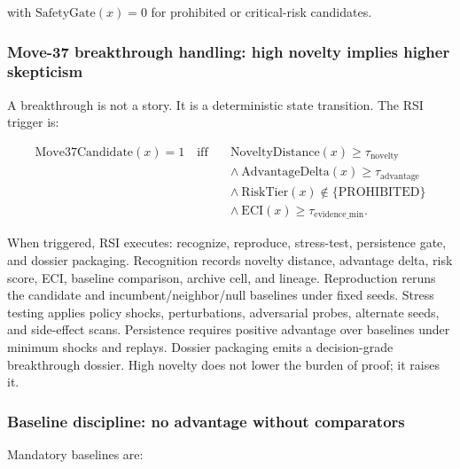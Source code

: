 \documentclass[
  11pt,
]{article}
\begin{document}
with \(\mathrm{SafetyGate}(x)=0\) for prohibited or critical-risk
candidates.

\subsubsection{Move-37 breakthrough handling: high novelty implies
higher
skepticism}\label{move-37-breakthrough-handling-high-novelty-implies-higher-skepticism}

A breakthrough is not a story. It is a deterministic state transition.
The RSI trigger is:

\[
\begin{aligned}
\mathrm{Move37Candidate}(x)=1
\quad\mathrm{iff}\quad&
\mathrm{NoveltyDistance}(x)\geq\tau_{\mathrm{novelty}}\\
&\wedge\ \mathrm{AdvantageDelta}(x)\geq\tau_{\mathrm{advantage}}\\
&\wedge\ \mathrm{RiskTier}(x)\notin\{\mathrm{PROHIBITED}\}\\
&\wedge\ \mathrm{ECI}(x)\geq\tau_{\mathrm{evidence\_min}} .
\end{aligned}
\]

When triggered, RSI executes: recognize, reproduce, stress-test,
persistence gate, and dossier packaging. Recognition records novelty
distance, advantage delta, risk score, ECI, baseline comparison, archive
cell, and lineage. Reproduction reruns the candidate and
incumbent/neighbor/null baselines under fixed seeds. Stress testing
applies policy shocks, perturbations, adversarial probes, alternate
seeds, and side-effect scans. Persistence requires positive advantage
over baselines under minimum shocks and replays. Dossier packaging emits
a decision-grade breakthrough dossier. High novelty does not lower the
burden of proof; it raises it.

\subsubsection{Baseline discipline: no advantage without
comparators}\label{baseline-discipline-no-advantage-without-comparators}

Mandatory baselines are:
\end{document}
